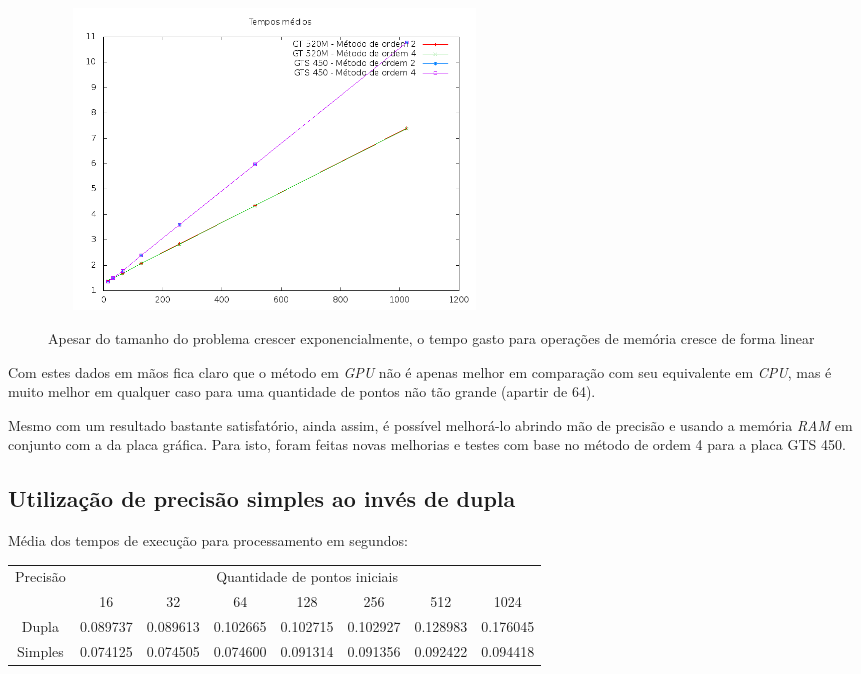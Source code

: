   \begin{figure}[!h]
    \begin{center}
       \includegraphics[width=120mm, height=80mm]{images/gpu-memo-means-double.png}
       \label{fig:gpu-memo-means-double}
       \caption{Apesar do tamanho do problema crescer exponencialmente, o tempo gasto para operações de memória cresce de forma linear}
    \end{center}
  \end{figure}
  
  Com estes dados em mãos fica claro que o método em \textit{GPU} não é apenas melhor em comparação com seu equivalente em \textit{CPU}, mas é muito melhor em qualquer caso para uma quantidade de pontos não tão grande (apartir de 64).
  
  Mesmo com um resultado bastante satisfatório, ainda assim, é possível melhorá-lo abrindo mão de precisão e usando a memória \textit{RAM} em conjunto com a da placa gráfica. Para isto, foram feitas novas melhorias e testes com base no método de ordem 4 para a placa GTS 450.

  \subsection{Utilização de precisão simples ao invés de dupla}
  Média dos tempos de execução para processamento em segundos:\\
  \begin{scriptsize}
  \begin{tabular}{| c | c | c | c | c | c | c | c |}
    \hline
    \multirow{2}{*}{Precisão}& \multicolumn{7}{|c|}{Quantidade de pontos iniciais} \\ \cline{2-8}
    & 16 & 32 & 64 & 128 & 256 & 512 & 1024 \\ \hline
    Dupla & 0.089737 & 0.089613 & 0.102665 & 0.102715 & 0.102927 & 0.128983 & 0.176045\\ \hline
    Simples & 0.074125 & 0.074505 & 0.074600 & 0.091314 & 0.091356 & 0.092422 & 0.094418\\ \hline

    \hline
  \end{tabular}
  \end{scriptsize}
  \hspace{1mm}\newline
  
